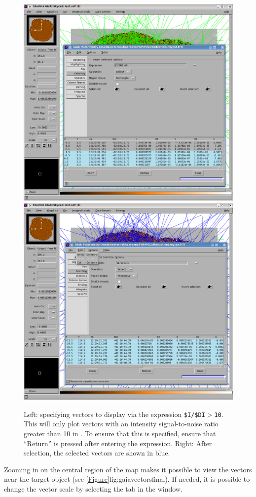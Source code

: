 \begin{figure}[t!]
\begin{center}
\includegraphics[width=0.46\linewidth]{sc22-gaia-plot-vectors-4.png}
\includegraphics[width=0.46\linewidth]{sc22-gaia-plot-vectors-6.png}
\caption [Selecting Vectors in GAIA]{Left: specifying vectors
  to display via the expression \texttt{\$I/\$DI$>$10}. This will only plot
  vectors with an intensity signal-to-noise
  ratio greater than 10 in \GAIA. To ensure that this is specified,
  ensure that ``Return'' is pressed after entering the expression.
  Right: After selection, the selected vectors are shown in blue.
}
\label{fig:gaiavectorssecond}
\end{center}
\end{figure}

Zooming in on the central region of the map makes it possible to view
the vectors near the target object (see \cref{Figure}{fig:gaiavectorsfinal}{}).
If needed, it is possible to change the vector scale by selecting the 
tab in the  window.


